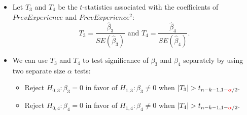 \documentclass[notes=show,compress,beamer]{beamer}
\begin{document}
\begin{frame}%


\begin{itemize}
\item Let $T_{3}$ and $T_{4}$ be the $t$-statistics associated with the
coefficients of $PrevExperience$ and $PrevExperience^{2}:$%
\begin{equation*}
T_{3}=\frac{\hat{\beta}_{3}}{SE\left( \hat{\beta}_{3}\right) }\text{ and }%
T_{4}=\frac{\hat{\beta}_{4}}{SE\left( \hat{\beta}_{4}\right) }.
\end{equation*}%
\pause%

\item We can use $T_{3}$ and $T_{4}$ to test significance of $\beta _{3}$
and $\beta _{4}$ 
\color{red}%
separately 
\color{black}%
by using two separate 
\color{blue}%
size $\alpha $ 
\color{black}%
tests:%
\pause%

\begin{itemize}
\item Reject $H_{0,3}:\beta _{3}=0$ in favor of $H_{1,3}:\beta _{3}\neq 0$
when $\left\vert T_{3}\right\vert >t_{n-k-1,1-%
\color{red}%
\alpha 
\color{black}%
/2}.$%
\pause%

\item Reject $H_{0,4}:\beta _{4}=0$ in favor of $H_{1,4}:\beta _{4}\neq 0$
when $\left\vert T_{4}\right\vert >t_{n-k-1,1-%
\color{red}%
\alpha 
\color{black}%
/2}.$
\end{itemize}
\end{itemize}

\end{frame}%
\end{document}
